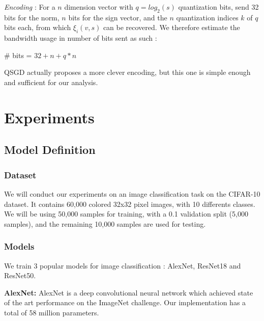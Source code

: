 \documentclass[10pt,conference,compsocconf]{IEEEtran}
\begin{document}
\vspace{-0.6em}
\singlespacing
\noindent \emph{Encoding} : For a $n$ dimension vector with $q = log_2(s)$ quantization bits, send 32 bits for the norm, $n$ bits for the sign vector, and the $n$ quantization indices $k$ of $q$ bits each, from which $\xi_i(v, s)$ can be recovered.
\vspace{-0.6em}
\singlespacing
We therefore estimate the bandwidth usage in number of bits sent as such :

\begin{center}
 \# bits = $32 + n + q * n$
\end{center}

QSGD actually proposes a more clever encoding, but this one is simple enough and sufficient for our analysis.

\section{Experiments}

\subsection{Model Definition}

\subsubsection{Dataset}

We will conduct our experiments on an image classification task on the CIFAR-10 dataset. It contains 60,000 colored 32x32 pixel images, with 10 differents classes. We will be using 50,000 samples for training, with a 0.1 validation split (5,000 samples), and the remaining 10,000 samples are used for testing.

\subsubsection{Models}

We train 3 popular models for image classification : AlexNet, ResNet18 and ResNet50. 

\noindent \textbf{AlexNet:} AlexNet is a deep convolutional neural network which achieved state of the art performance on the ImageNet challenge. Our implementation \cite{alexnet} has a total of 58 million parameters.
\end{document}

